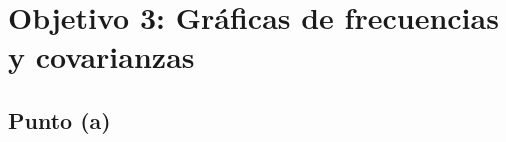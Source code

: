 \section{Objetivo 3: Gráficas de frecuencias y covarianzas}
\newcommand{\StatsBox}[2]{%
  \begin{center}%
    \begin{tcolorbox}[width=0.95\textwidth,colback=white,colframe=black,boxrule=0.4pt,arc=1mm,left=1.2mm,right=1.2mm,top=1mm,bottom=1mm]%
      \footnotesize \textbf{#1}\\#2
    \end{tcolorbox}%
  \end{center}%
}

\makeatletter
\newcommand{\captionofmaybe}[2]{%
  \@ifundefined{captionof}{%
    \refstepcounter{#1}%
    \addcontentsline{\csname ext@#1\endcsname}{#1}{\protect\numberline{\csname the#1\endcsname}{#2}}%
    \par\smallskip\noindent\textbf{\csname fnum@#1\endcsname.}~#2\par
  }{%
    \captionof{#1}{#2}%
  }%
}
\makeatother

\subsection{Punto (a)}
\par\medskip
